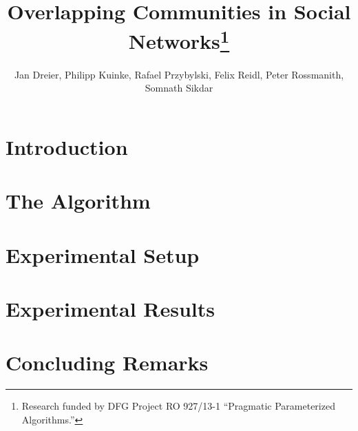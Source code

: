 \documentclass[11pt]{llncs}
\title{Overlapping Communities in Social Networks\thanks{Research 
funded by DFG Project RO 927/13-1 ``Pragmatic Parameterized Algorithms.''}}
\author{Jan Dreier, 
Philipp Kuinke, 
Rafael Przybylski,
Felix Reidl, 
Peter Rossmanith, 
Somnath Sikdar
}
\institute{Theoretical Computer Science, \\ 
RWTH Aachen University, \\
52074 Aachen Germany}
\begin{document}
\maketitle

\begin{abstract}

\end{abstract}

\section{Introduction}


\section{The Algorithm} \label{sec:algorithm}


\section{Experimental Setup} \label{sec:experiment_setup}



\section{Experimental Results}\label{sec:experiment_results}




%

\section{Concluding Remarks} \label{sec:conclusions}

\def\redefineme{
    \def\LNCS{LNCS}%
    \def\ICALP##1{Proc. of ##1 ICALP}%
    \def\FOCS##1{Proc. of ##1 FOCS}%
    \def\COCOON##1{Proc. of ##1 COCOON}%
    \def\SODA##1{Proc. of ##1 SODA}%
    \def\SWAT##1{Proc. of ##1 SWAT}%
    \def\IWPEC##1{Proc. of ##1 IWPEC}%
    \def\IWOCA##1{Proc. of ##1 IWOCA}%
    \def\ISAAC##1{Proc. of ##1 ISAAC}%
    \def\STACS##1{Proc. of ##1 STACS}%
    \def\ESA##1{Proc. of ##1 ESA}%
    \def\WG##1{Proc. of ##1 WG}%
    \def\LIPIcs##1{LIPIcs}%
    \def\LIPIcs{LIPIcs}%
    \def\LICS##1{Proc. of ##1 LICS}%
}

%


\end{document}
